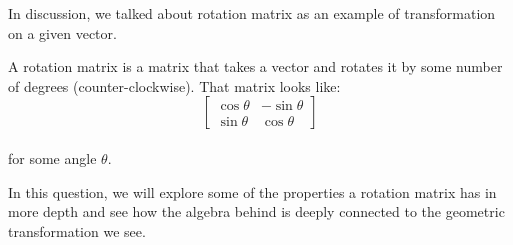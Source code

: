 In discussion, we talked about rotation matrix as an example of transformation on a given vector. 

A rotation matrix is a matrix that takes a vector and rotates it by some number of degrees (counter-clockwise). That matrix looks like: \\
  $$\begin{bmatrix}
  \cos{\theta} & -\sin{\theta} \\
  \sin{\theta} & \cos{\theta} \end{bmatrix}$$ \\

  for some angle $\theta$. 

  In this question, we will explore some of the properties a rotation matrix has in more depth and see how the algebra behind is deeply connected to the geometric transformation we see.

